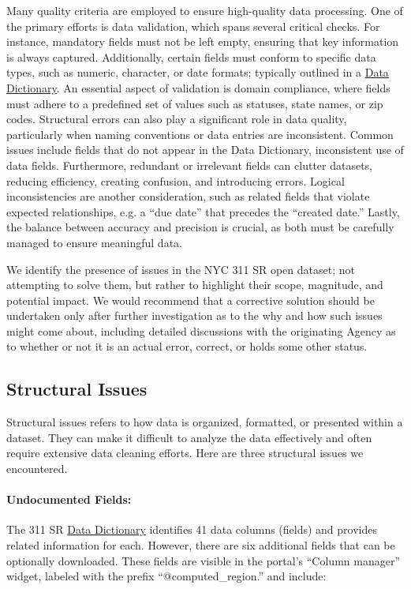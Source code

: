 \documentclass[linenumber]{jdsart}
\begin{document}
Many quality criteria are employed to ensure high\mbox{-}quality data 
processing. One of the primary efforts is data validation, which spans 
several critical checks. For instance, mandatory fields must not be 
left empty, ensuring that key information is always captured. 
Additionally, certain fields must conform to specific data types, 
such as numeric, character, or date formats; typically 
outlined in a \href{https://data.cityofnewyork.us/api/views/erm2-nwe9/files/b372b884-f86a-453b-ba16-1fe06ce9d212?download=true&filename=311_ServiceRequest_2010-Present_DataDictionary_Updated_2023.xlsx}{Data Dictionary}. An 
essential aspect of validation is domain compliance, where 
fields must adhere to a predefined set of 
values such as statuses, state names, or zip codes. Structural 
errors can also play a significant role in data quality, particularly when 
naming conventions or data entries are inconsistent. Common issues 
include fields that do not appear in the Data Dictionary,  
inconsistent use of data fields. Furthermore, redundant 
or irrelevant fields can clutter datasets, reducing efficiency, 
creating confusion, and introducing errors. Logical inconsistencies 
are another consideration, such as related fields that violate expected 
relationships, e.g. a ``due date'' that precedes the ``created date.'' 
Lastly, the balance between accuracy and precision is crucial, as both 
must be carefully managed to ensure meaningful data.


We identify the presence of issues in the NYC 311 SR open dataset;
not attempting to solve them, but rather to highlight their scope, 
magnitude, and potential impact. We would recommend 
that a corrective solution should be undertaken only 
after further investigation as to the why and how such 
issues might come about, including  detailed discussions 
with the originating Agency as to whether or not it is an 
actual error, correct,  or holds some other status.


\subsection{Structural Issues}
\label{sec:structural}
Structural issues refers to how data is organized, formatted, 
or presented within a dataset. They can make 
it difficult to analyze the data effectively and often require extensive 
data cleaning efforts. Here are three structural issues we encountered.
 
\paragraph{Undocumented Fields:} The 311 SR 
\href{https://data.cityofnewyork.us/api/views/erm2-nwe9/files/b372b884-f86a-453b-ba16-1fe06ce9d212?download=true&filename=311_ServiceRequest_2010-Present_DataDictionary_Updated_2023.xlsx}{Data Dictionary} 
identifies 41 data columns (fields) and provides related information 
for each. However, there are six additional fields that can be
optionally downloaded. These fields are 
visible in the portal's ``Column manager'' widget, labeled with the prefix 
``@computed\_region.'' and include:
\end{document}
